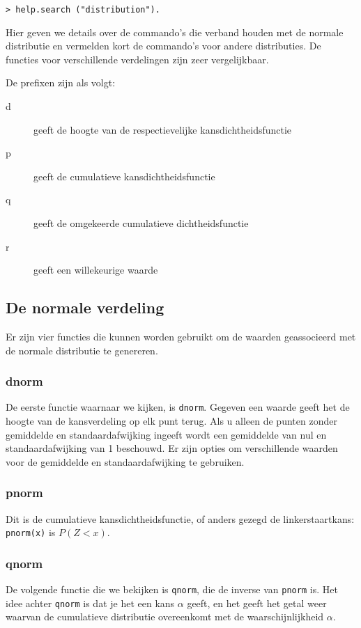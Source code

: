 \begin{lstlisting}
> help.search ("distribution").
\end{lstlisting}


Hier geven we details over de commando's die verband houden met de normale distributie en vermelden kort de commando's voor andere distributies. De functies voor verschillende verdelingen zijn zeer vergelijkbaar.

De prefixen zijn als volgt:
\begin{description}
	\item[d] geeft de hoogte van de respectievelijke kansdichtheidsfunctie
	\item[p] geeft de cumulatieve kansdichtheidsfunctie
	\item[q] geeft de omgekeerde cumulatieve dichtheidsfunctie
	\item[r] geeft een willekeurige waarde
\end{description}

\subsection{De normale verdeling}
Er zijn vier functies die kunnen worden gebruikt om de waarden geassocieerd met de normale distributie te genereren.
\subsubsection{dnorm}

De eerste functie waarnaar we kijken, is \texttt{dnorm}. Gegeven een waarde geeft het de hoogte van de kansverdeling op elk punt terug. Als u alleen de punten zonder gemiddelde en standaardafwijking ingeeft wordt een gemiddelde van nul en standaardafwijking van 1 beschouwd. Er zijn opties om verschillende waarden voor de gemiddelde en standaardafwijking te gebruiken.



\subsubsection{pnorm}

Dit is de cumulatieve kansdichtheidsfunctie, of anders gezegd de linkerstaartkans: \texttt{pnorm(x)} is $P(Z < x)$.

\subsubsection{qnorm}
De volgende functie die we bekijken is \texttt{qnorm}, die de inverse van \texttt{pnorm} is. Het idee achter \texttt{qnorm} is dat je het een kans $\alpha$ geeft, en het geeft het getal weer waarvan de cumulatieve distributie overeenkomt met de waarschijnlijkheid $\alpha$.

